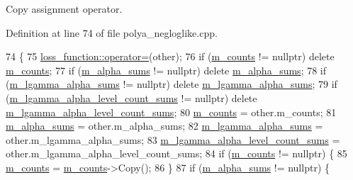 Copy assignment operator. 

Definition at line 74 of file polya\+\_\+negloglike.\+cpp.


\begin{DoxyCode}
74                                                                            \{
75   \hyperlink{classlbann_1_1loss__function_ab882c642619ea4285b61e735d84e401c}{loss\_function::operator=}(other);
76   \textcolor{keywordflow}{if} (\hyperlink{classlbann_1_1polya__negloglike_a441387814cd7deafb1f70c91926d3004}{m\_counts} != \textcolor{keyword}{nullptr}) \textcolor{keyword}{delete} \hyperlink{classlbann_1_1polya__negloglike_a441387814cd7deafb1f70c91926d3004}{m\_counts};
77   \textcolor{keywordflow}{if} (\hyperlink{classlbann_1_1polya__negloglike_aa77620f256de700ae8b3ca921957bcd1}{m\_alpha\_sums} != \textcolor{keyword}{nullptr}) \textcolor{keyword}{delete} \hyperlink{classlbann_1_1polya__negloglike_aa77620f256de700ae8b3ca921957bcd1}{m\_alpha\_sums};
78   \textcolor{keywordflow}{if} (\hyperlink{classlbann_1_1polya__negloglike_a0aec768ffa50a8b716149d597699eddb}{m\_lgamma\_alpha\_sums} != \textcolor{keyword}{nullptr}) \textcolor{keyword}{delete} 
      \hyperlink{classlbann_1_1polya__negloglike_a0aec768ffa50a8b716149d597699eddb}{m\_lgamma\_alpha\_sums};
79   \textcolor{keywordflow}{if} (\hyperlink{classlbann_1_1polya__negloglike_a78c9da1fb83c7b79a12cfbf30a4cb59e}{m\_lgamma\_alpha\_level\_count\_sums} != \textcolor{keyword}{nullptr}) \textcolor{keyword}{delete} 
      \hyperlink{classlbann_1_1polya__negloglike_a78c9da1fb83c7b79a12cfbf30a4cb59e}{m\_lgamma\_alpha\_level\_count\_sums};
80   \hyperlink{classlbann_1_1polya__negloglike_a441387814cd7deafb1f70c91926d3004}{m\_counts} = other.m\_counts;
81   \hyperlink{classlbann_1_1polya__negloglike_aa77620f256de700ae8b3ca921957bcd1}{m\_alpha\_sums} = other.m\_alpha\_sums;
82   \hyperlink{classlbann_1_1polya__negloglike_a0aec768ffa50a8b716149d597699eddb}{m\_lgamma\_alpha\_sums} = other.m\_lgamma\_alpha\_sums;
83   \hyperlink{classlbann_1_1polya__negloglike_a78c9da1fb83c7b79a12cfbf30a4cb59e}{m\_lgamma\_alpha\_level\_count\_sums} = other.m\_lgamma\_alpha\_level\_count\_sums;
84   \textcolor{keywordflow}{if} (\hyperlink{classlbann_1_1polya__negloglike_a441387814cd7deafb1f70c91926d3004}{m\_counts} != \textcolor{keyword}{nullptr}) \{
85     \hyperlink{classlbann_1_1polya__negloglike_a441387814cd7deafb1f70c91926d3004}{m\_counts} = \hyperlink{classlbann_1_1polya__negloglike_a441387814cd7deafb1f70c91926d3004}{m\_counts}->Copy();
86   \}
87   \textcolor{keywordflow}{if} (\hyperlink{classlbann_1_1polya__negloglike_aa77620f256de700ae8b3ca921957bcd1}{m\_alpha\_sums} != \textcolor{keyword}{nullptr}) \{

\end{DoxyCode}
